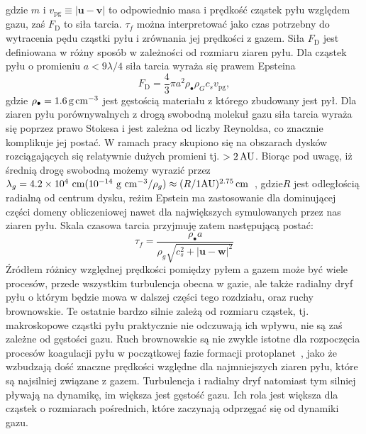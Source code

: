 gdzie $m$ i $v_{\textrm{pg}}\equiv|\mathbf{u} - \mathbf{v}|$ to odpowiednio masa
i prędkość cząstek pyłu względem gazu, zaś $F_\textrm{D}$ to siła tarcia.
$\tau_f$ można interpretować jako czas potrzebny do wytracenia pędu cząstki pyłu
i zrównania jej prędkości z gazem. Siła $F_\textrm{D}$ jest definiowana w różny
sposób w zależności od rozmiaru ziaren pyłu. Dla cząstek pyłu o promieniu $a < 9
\lambda / 4$ siła tarcia wyraża się prawem Epsteina 
\begin{equation}
   F_\textrm{D} = \frac{4}{3}\pi a^2 \rho_\bullet \rho_G c_s v_\textrm{pg}, 
\end{equation}
gdzie $\rho_\bullet = 1.6\hbox{$\thinspace\textrm{g}$}\hbox{$\thinspace\textrm{cm}$}^{-3}$ jest gęstością materiału z którego
zbudowany jest pył. Dla ziaren pyłu porównywalnych z drogą swobodną molekuł
gazu siła tarcia wyraża się poprzez prawo Stokesa i jest zależna od liczby
Reynoldsa, co znacznie komplikuje jej postać. W ramach pracy skupiono się na
obszarach dysków rozciągających się relatywnie dużych promieni tj. $>2\hbox{$\thinspace\textrm{AU}$}$.
Biorąc pod uwagę, iż średnią drogę swobodną możemy wyrazić przez $\lambda_g =
4.2\times 10^4\textrm{ cm} (10^{-14}\textrm{ g cm}^{-3}/\rho_g) \approx (R/1
\textrm{AU})^{2.75}\hbox{$\thinspace\textrm{cm}$}$~\citep{W77,BT09}, gdzie$R$ jest odległością radialną od
centrum dysku, reżim Epstein ma zastosowanie dla dominującej części domeny
obliczeniowej nawet dla największych symulowanych przez nas ziaren pyłu. Skala
czasowa tarcia przyjmuję zatem następującą postać:
%
\begin{equation} 
   \tau_f = \frac{\rho_\bullet a} {\rho_g \sqrt{c_s^2 +
      |\mathbf{u} - \mathbf{w}|^2 }} \label{eq:tauf} 
\end{equation}
%
Źródłem różnicy względnej prędkości pomiędzy pyłem a gazem może być wiele
procesów, przede wszystkim turbulencja obecna w gazie, ale także radialny dryf
pyłu o którym będzie mowa w dalszej części tego rozdziału, oraz ruchy
brownowskie. Te ostatnie bardzo silnie zależą od rozmiaru cząstek, tj.
makroskopowe cząstki pyłu praktycznie nie odczuwają ich wpływu, nie są zaś
zależne od gęstości gazu. Ruch brownowskie są nie zwykle istotne dla rozpoczęcia
procesów koagulacji pyłu w początkowej fazie formacji
protoplanet~\citep{DD05}, jako że wzbudzają dość znaczne prędkości względne
dla najmniejszych ziaren pyłu, które są najsilniej związane z gazem. Turbulencja
i radialny dryf natomiast tym silniej pływają na dynamikę, im większa jest
gęstość gazu. Ich rola jest większa dla cząstek o rozmiarach pośrednich, które
zaczynają odprzęgać się od dynamiki gazu.

